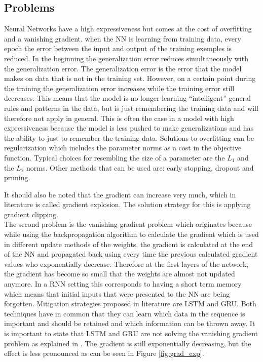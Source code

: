 \subsection{Problems}\label{s:Problems}
Neural Networks have a high expressiveness but comes at the cost of overfitting and a vanishing gradient.
when the NN is learning from training data, every epoch the error between the input and output of the training exemples is reduced. In the beginning the generalization error reduces simultaneously with the generalization error. The generalization error is the error that the model makes on data that is not in the training set. However, on a certain point during the training the generalization error increases while the training error still decreases. This means that the model is no longer learning ``intelligent'' general rules and patterns in the data, but is just remembering the training data and will therefore not apply in general. This is often the case in a model with high expressiveness because the model is less pushed to make generalizations and has the ability to just to remember the training data. Solutions to overfitting can be regularization which includes the parameter norms as a cost in the objective function. Typical choices for resembling the size of a parameter are the $ L_1 $ and the $ L_2 $ norms. Other methods that can be used are: early stopping, dropout and pruning.

It should also be noted that the gradient can increase very much, which in literature is called gradient explosion. The solution strategy for this is applying gradient clipping.\\

The second problem is the vanishing gradient problem which originates because while using the backpropagation algorithm to calculate the gradient which is used in different update methods of the weights, the gradient is calculated at the end of the NN and propagated back using every time the previous calculated gradient values who exponentially decrease. Therefore at the first layers of the network, the gradient has become so small that the weights are almost not updated anymore. In a RNN setting this corresponds to having a short term memory which means that initial inputs that were presented to the NN are being forgotten. Mitigation strategies proposed in literature are LSTM and GRU. Both techniques have in common that they can learn which data in the sequence is important and should be retained and which information can be thrown away. It is important to state that LSTM and GRU are not solving the vanishing gradient problem as explained in \cite{Teuwen2019}. The gradient is still exponentially decreasing, but the effect is less pronounced as can be seen in Figure \ref{fig:grad_exp}.\\ 

